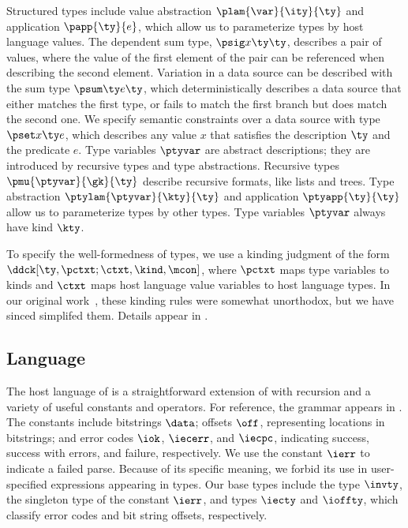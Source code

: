 {Structured types include value abstraction $\plam{\var}{\ity}{\ty}$
and application $\papp{\ty}{e}$, which allow us to parameterize types
by host language values. 
The dependent sum type, $\psig x \ty \ty$, describes a pair of values,
where the value of the first element of the pair can be referenced
when describing the second element.  Variation in a data source can be
described with the sum type $\psum \ty e \ty$, which deterministically
describes a data source that either matches the first type, or fails
to match the first branch but does match the second one.
We specify semantic constraints over a data source
with type $\pset x \ty e$, which describes any value $x$ that satisfies the
description $\ty$ and the predicate $e$. Type variables $\ptyvar$ are
abstract descriptions; they are introduced by recursive types and type
abstractions. Recursive types $\pmu{\ptyvar}{\gk}{\ty}$ describe
recursive formats, like lists and trees. Type abstraction
$\ptylam{\ptyvar}{\kty}{\ty}$ and application $\ptyapp{\ty}{\ty}$
allow us to parameterize types by other types.  Type variables $\ptyvar$
always have kind $\kty$.

To specify the well-formedness of types, 
we use a kinding judgment of the form
$\ddck[\ty,\pctxt;\ctxt,\kind,\mcon]$,
where $\pctxt$ maps type variables 
to kinds and $\ctxt$ maps host language value variables to host language 
types. In our original work~\cite{fisher+:next700ddl}, these kinding rules
were somewhat unorthodox, but we have sinced simplifed them.  
Details appear in .

\subsection{\Implang{} Language}
\label{sec:host-lang}
The host language of \ddc{} is a straightforward 
extension of \fomega{} with recursion and a variety of useful constants
and operators.  
For reference, the grammar appears in .
The constants include bitstrings $\data$; offsets $\off$, representing
locations in bitstrings; and error codes $\iok$, $\iecerr$, and
$\iecpc$, indicating success, success with errors, and failure,
respectively. We use the constant $\ierr$ to indicate a failed parse.
Because of its specific meaning, we forbid its use in user-specified
expressions appearing in \ddc{} types.
Our base types include the type $\invty$, the singleton type of the
constant $\ierr$, and types $\iecty$ and $\ioffty$, which classify
error codes and bit string offsets, respectively.

}
